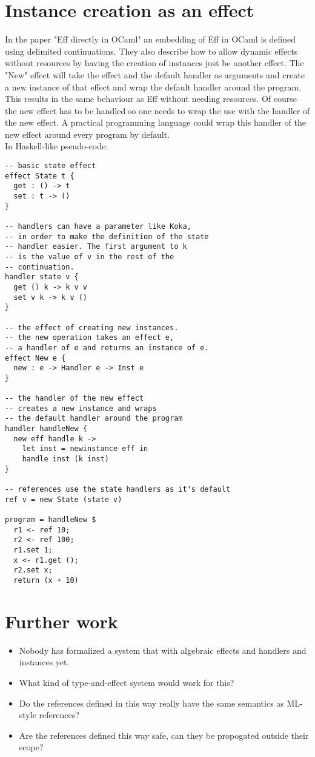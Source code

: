 \documentclass[12pt]{article}
\begin{document}
\section{Instance creation as an effect}
In the paper "Eff directly in OCaml"\cite{effdirect} an embedding of Eff in OCaml is defined using delimited continuations.
They also describe how to allow dynamic effects without resources by having the creation of instances just be another effect.
The "New" effect will take the effect and the default handler as arguments and create a new instance of that effect and wrap the default handler around the program.
This results in the same behaviour as Eff without needing resources. Of course the new effect has to be handled so one needs to wrap the use with the handler of the new effect.
A practical programming language could wrap this handler of the new effect around every program by default. \\
\newpage
In Haskell-like pseudo-code:
\begin{lstlisting}
-- basic state effect
effect State t {
  get : () -> t
  set : t -> ()
}

-- handlers can have a parameter like Koka,
-- in order to make the definition of the state
-- handler easier. The first argument to k
-- is the value of v in the rest of the
-- continuation.
handler state v {
  get () k -> k v v
  set v k -> k v ()
}

-- the effect of creating new instances.
-- the new operation takes an effect e,
-- a handler of e and returns an instance of e.
effect New e {
  new : e -> Handler e -> Inst e
}

-- the handler of the new effect
-- creates a new instance and wraps
-- the default handler around the program
handler handleNew {
  new eff handle k ->
    let inst = newinstance eff in
    handle inst (k inst)
}

-- references use the state handlers as it's default
ref v = new State (state v)

program = handleNew $
  r1 <- ref 10;
  r2 <- ref 100;
  r1.set 1;
  x <- r1.get ();
  r2.set x;
  return (x + 10)
\end{lstlisting}

\section{Further work}
\begin{itemize}
\item Nobody has formalized a system that with algebraic effects and handlers and instances yet.
\item What kind of type-and-effect system would work for this?
\item Do the references defined in this way really have the same semantics as ML-style references?
\item Are the references defined this way safe, can they be propogated outside their scope?
\end{itemize}
\end{document}
